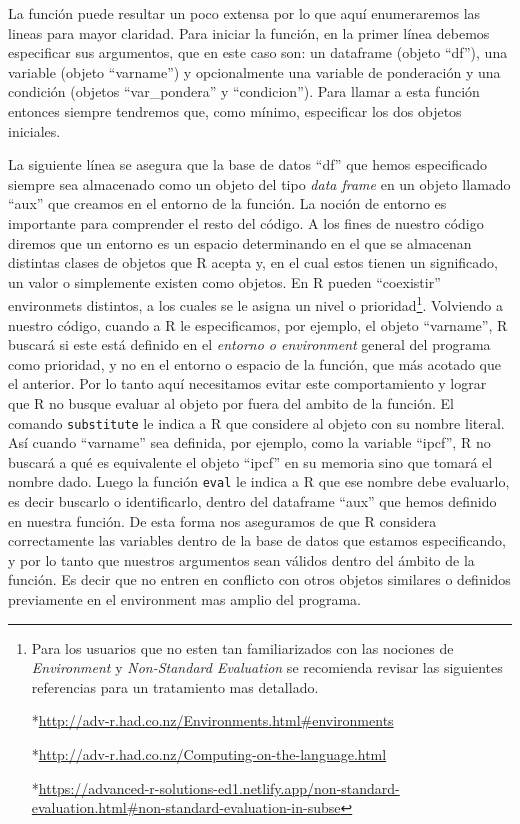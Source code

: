 \documentclass[
]{book}
\begin{document}
La función puede resultar un poco extensa por lo que aquí enumeraremos las lineas para mayor claridad.
Para iniciar la función, en la primer línea debemos especificar sus argumentos, que en este caso son: un dataframe (objeto ``df''), una variable (objeto ``varname'') y opcionalmente una variable de ponderación y una condición (objetos ``var\_pondera'' y ``condicion''). Para llamar a esta función entonces siempre tendremos que, como mínimo, especificar los dos objetos iniciales.

La siguiente línea se asegura que la base de datos ``df'' que hemos especificado siempre sea almacenado como un objeto del tipo \emph{data frame} en un objeto llamado ``aux'' que creamos en el entorno de la función. La noción de entorno es importante para comprender el resto del código. A los fines de nuestro código diremos que un entorno es un espacio determinando en el que se almacenan distintas clases de objetos que R acepta y, en el cual estos tienen un significado, un valor o simplemente existen como objetos. En R pueden ``coexistir'' environmets distintos, a los cuales se le asigna un nivel o prioridad\footnote{Para los usuarios que no esten tan familiarizados con las nociones de \emph{Environment} y \emph{Non-Standard Evaluation} se recomienda revisar las siguientes referencias para un tratamiento mas detallado.

  *\url{http://adv-r.had.co.nz/Environments.html\#environments}

  *\url{http://adv-r.had.co.nz/Computing-on-the-language.html}

  *\url{https://advanced-r-solutions-ed1.netlify.app/non-standard-evaluation.html\#non-standard-evaluation-in-subse}}. Volviendo a nuestro código, cuando a R le especificamos, por ejemplo, el objeto ``varname'', R buscará si este está definido en el \emph{entorno o environment} general del programa como prioridad, y no en el entorno o espacio de la función, que más acotado que el anterior. Por lo tanto aquí necesitamos evitar este comportamiento y lograr que R no busque evaluar al objeto por fuera del ambito de la función. El comando \texttt{substitute} le indica a R que considere al objeto con su nombre literal. Así cuando ``varname'' sea definida, por ejemplo, como la variable ``ipcf'', R no buscará a qué es equivalente el objeto ``ipcf'' en su memoria sino que tomará el nombre dado. Luego la función \texttt{eval} le indica a R que ese nombre debe evaluarlo, es decir buscarlo o identificarlo, dentro del dataframe ``aux'' que hemos definido en nuestra función. De esta forma nos aseguramos de que R considera correctamente las variables dentro de la base de datos que estamos especificando, y por lo tanto que nuestros argumentos sean válidos dentro del ámbito de la función. Es decir que no entren en conflicto con otros objetos similares o definidos previamente en el environment mas amplio del programa.
\end{document}
